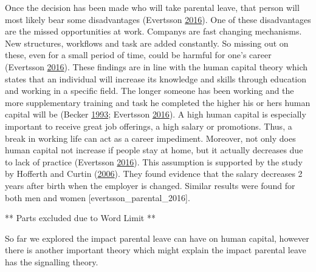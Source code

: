 \documentclass[
  11pt,
]{article}
\begin{document}
Once the decision has been made who will take parental leave, that person will most likely bear some disadvantages (Evertsson \protect\hyperlink{ref-evertsson_parental_2016}{2016}).
One of these disadvantages are the missed opportunities at work. Companys are fast changing mechanisms. New structures, workflows and task are added constantly. So missing out on these, even for a small period of time, could be harmful for one's career (Evertsson \protect\hyperlink{ref-evertsson_parental_2016}{2016}). These findings are in line with the human capital theory which states that an individual will increase its knowledge and skills through education and working in a specific field. The longer someone has been working and the more supplementary training and task he completed the higher his or hers human capital will be (Becker \protect\hyperlink{ref-becker_human_1993}{1993}; Evertsson \protect\hyperlink{ref-evertsson_parental_2016}{2016}). A high human capital is especially important to receive great job offerings, a high salary or promotions. Thus, a break in working life can act as a career impediment. Moreover, not only does human capital not increase if people stay at home, but it actually decreases due to lack of practice (Evertsson \protect\hyperlink{ref-evertsson_parental_2016}{2016}). This assumption is supported by the study by Hofferth and Curtin (\protect\hyperlink{ref-hofferth_parental_2006}{2006}). They found evidence that the salary decreases 2 years after birth when the employer is changed. Similar results were found for both men and women {[}evertsson\_parental\_2016{]}.

** Parts excluded due to Word Limit **

So far we explored the impact parental leave can have on human capital, however there is another important theory which might explain the impact parental leave has the signalling theory.
\end{document}
